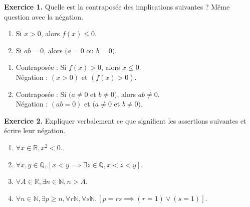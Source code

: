 \documentclass[a4paper, 10pt]{report}
\begin{document}
	
	\renewcommand{\headrule}{
		\color{lightgray} \par\noindent\rule{\textwidth}{2pt}
	}	
	\pagestyle{fancy}
	\fancyhf{}
	
	
	\vspace{5mm}
	\noindent
	\textbf{Exercice 1.} Quelle est la contraposée des implications
	suivantes ? Même question avec la négation.
	\begin{enumerate}[label=(\roman*)]
		\item Si $x > 0$, alors $f(x) \leq 0$.
		\item Si $ab = 0$, alors $(a = 0$ ou $b = 0)$.
	\end{enumerate}
	
	\colorbox{solution}
	{
		\begin{minipage}{0.9\textwidth}
			\begin{enumerate}[label=(\roman*)]
				\item Contraposée : Si $f(x) > 0$, alors $x \leq 0$.\\
					Négation : $(x > 0)$ et $(f(x) >0)$.
				\item Contraposée : Si $(a \neq 0$ et $b \neq 0)$, alors $ab \neq 0$.\\
				Négation : $(ab = 0)$ et $(a \neq 0$ et $b \neq 0)$.
			\end{enumerate}
		\end{minipage}
	}
		
	\vspace{5mm}
	\noindent
	\textbf{Exercice 2.} Expliquer verbalement ce que signifient les
	assertions suivantes et écrire leur négation.
	\begin{enumerate}[label=(\roman*)]
		\item $\forall x \in \mathbb{R}, x^2 < 0$.
		\item $\forall x,y \in \mathbb{Q}, [x < y \implies
			\exists z \in \mathbb{Q}, x < z < y]$.
		\item $\forall A \in \mathbb{R}, \exists n \in \mathbb{N},
			n > A$.
		\item $\forall n \in \mathbb{N}, \exists p \geq n,
			\forall r \mathbb{N}, \forall s \mathbb{N},
			[p = rs \implies (r = 1) \lor (s = 1)]$.
	\end{enumerate}
	
\end{document}
